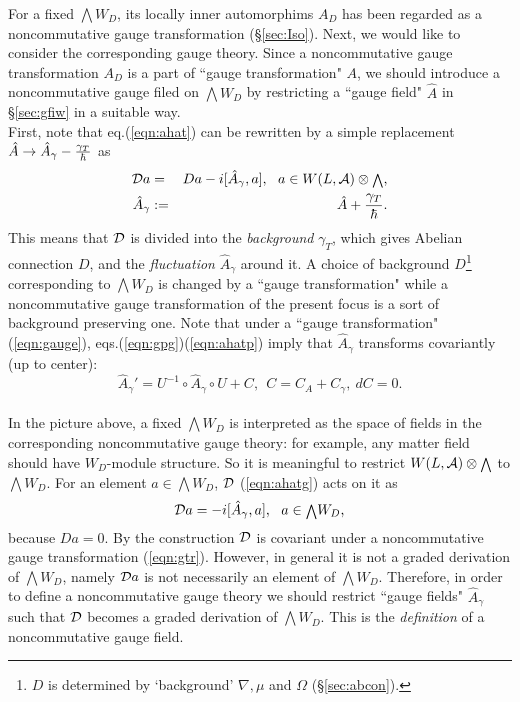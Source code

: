 \documentclass[10pt,a4paper]{article}
\def\h{\hbar}
\def\hA{{\hat A}}
\begin{document}
For a fixed ${\scriptstyle \bigwedge} W_D$, its locally inner automorphims $A_D$ has been regarded as a noncommutative gauge transformation (\S\ref{sec:Iso}). Next, we would like to consider the corresponding gauge theory. Since a noncommutative gauge transformation $A_D$ is a part of ``gauge transformation" $A$, we should introduce a noncommutative gauge filed on ${\scriptstyle \bigwedge} W_D$ by restricting a ``gauge field" $\hA$ in \S\ref{sec:gfiw} in a suitable way.\\

First, note that eq.(\ref{eqn:ahat}) can be rewritten by a simple replacement $\hA\rightarrow\hA_\gamma-{\gamma_T\over\h}$ as
\begin{eqnarray}
\label{eqn:ahatg}
{\cal D}a&=&Da-i[\hA_\gamma,a],\ \ a\in W(L,{\cal A})\otimes {\scriptstyle \bigwedge},\nonumber\\
\hA_\gamma&:=&\hA+{\gamma_T\over\h}.
\end{eqnarray}
This means that ${\cal D}$ is divided into the {\it background} $\gamma_T$, which gives Abelian connection $D$, and the {\it fluctuation} $\hA_\gamma$ around it. A choice of background $D$\footnote{
        $D$ is determined by `background' $\nabla,\mu$ and $\Omega$ (\S\ref{sec:abcon}).
} corresponding to ${\scriptstyle \bigwedge}W_D$ is changed by a ``gauge transformation" while a noncommutative gauge transformation of the present focus is a sort of background preserving one. 
Note that under a ``gauge transformation" (\ref{eqn:gauge}), eqs.(\ref{eqn:gpg})(\ref{eqn:ahatp}) imply that $\hA_\gamma$ transforms covariantly (up to center):
\begin{equation}
\label{eqn:Ag'}
\hA_\gamma'=U^{-1}\circ \hA_\gamma\circ U+C,\ \ C=C_A+C_\gamma,\ dC=0.
\end{equation}\\
In the picture above, a fixed ${\scriptstyle \bigwedge}W_D$ is interpreted as the space of fields in the corresponding noncommutative gauge theory: for example, any matter field should have $W_D$-module structure. So it is meaningful to restrict $W(L,{\cal A})\otimes {\scriptstyle \bigwedge} $ to ${\scriptstyle \bigwedge} W_D$. For an element $a\in{\scriptstyle \bigwedge} W_D$, ${\cal D}$ (\ref{eqn:ahatg}) acts on it as
\begin{equation}
\label{eqn:act}
{\cal D}a=-i[\hA_\gamma,a],\ \ a\in{\scriptstyle \bigwedge} W_D,
\end{equation}
because $Da=0$.
By the construction ${\cal D}$ is covariant under a noncommutative gauge transformation (\ref{eqn:gtr}). However, in general it is not a graded derivation of ${\scriptstyle \bigwedge} W_D$, namely ${\cal D}a$ is not necessarily an element of ${\scriptstyle \bigwedge} W_D$. Therefore, in order to define a noncommutative gauge theory we should restrict ``gauge fields" $\hA_\gamma$ such that ${\cal D}$ becomes a graded derivation of ${\scriptstyle \bigwedge} W_D$. This is the {\it definition} of a noncommutative gauge field. \\
\end{document}
